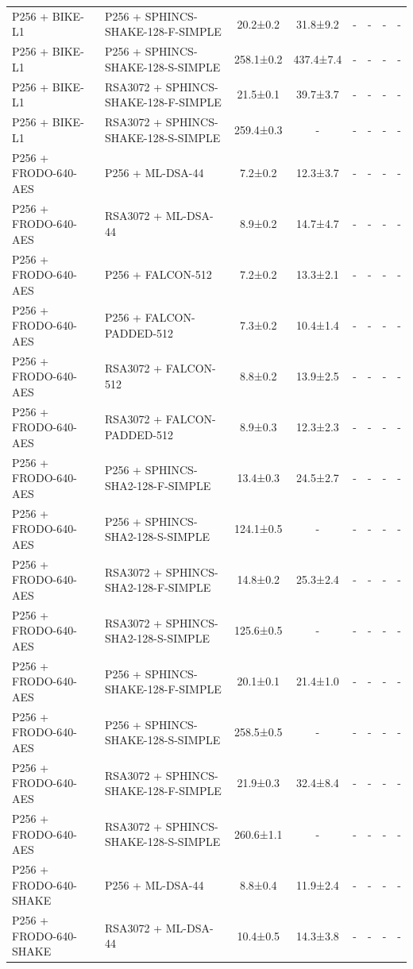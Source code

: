 \documentclass[10pt]{article}
\begin{document}
\begin{tabular}{@{}l l c c c c c c@{}}
P256 + BIKE-L1 & P256 + SPHINCS-SHAKE-128-F-SIMPLE & 20.2±0.2 & 31.8±9.2 & - & - & - & - \\
P256 + BIKE-L1 & P256 + SPHINCS-SHAKE-128-S-SIMPLE & 258.1±0.2 & 437.4±7.4 & - & - & - & - \\
P256 + BIKE-L1 & RSA3072 + SPHINCS-SHAKE-128-F-SIMPLE & 21.5±0.1 & 39.7±3.7 & - & - & - & - \\
P256 + BIKE-L1 & RSA3072 + SPHINCS-SHAKE-128-S-SIMPLE & 259.4±0.3 & - & - & - & - & - \\
P256 + FRODO-640-AES & P256 + ML-DSA-44 & 7.2±0.2 & 12.3±3.7 & - & - & - & - \\
P256 + FRODO-640-AES & RSA3072 + ML-DSA-44 & 8.9±0.2 & 14.7±4.7 & - & - & - & - \\
P256 + FRODO-640-AES & P256 + FALCON-512 & 7.2±0.2 & 13.3±2.1 & - & - & - & - \\
P256 + FRODO-640-AES & P256 + FALCON-PADDED-512 & 7.3±0.2 & 10.4±1.4 & - & - & - & - \\
P256 + FRODO-640-AES & RSA3072 + FALCON-512 & 8.8±0.2 & 13.9±2.5 & - & - & - & - \\
P256 + FRODO-640-AES & RSA3072 + FALCON-PADDED-512 & 8.9±0.3 & 12.3±2.3 & - & - & - & - \\
P256 + FRODO-640-AES & P256 + SPHINCS-SHA2-128-F-SIMPLE & 13.4±0.3 & 24.5±2.7 & - & - & - & - \\
P256 + FRODO-640-AES & P256 + SPHINCS-SHA2-128-S-SIMPLE & 124.1±0.5 & - & - & - & - & - \\
P256 + FRODO-640-AES & RSA3072 + SPHINCS-SHA2-128-F-SIMPLE & 14.8±0.2 & 25.3±2.4 & - & - & - & - \\
P256 + FRODO-640-AES & RSA3072 + SPHINCS-SHA2-128-S-SIMPLE & 125.6±0.5 & - & - & - & - & - \\
P256 + FRODO-640-AES & P256 + SPHINCS-SHAKE-128-F-SIMPLE & 20.1±0.1 & 21.4±1.0 & - & - & - & - \\
P256 + FRODO-640-AES & P256 + SPHINCS-SHAKE-128-S-SIMPLE & 258.5±0.5 & - & - & - & - & - \\
P256 + FRODO-640-AES & RSA3072 + SPHINCS-SHAKE-128-F-SIMPLE & 21.9±0.3 & 32.4±8.4 & - & - & - & - \\
P256 + FRODO-640-AES & RSA3072 + SPHINCS-SHAKE-128-S-SIMPLE & 260.6±1.1 & - & - & - & - & - \\
P256 + FRODO-640-SHAKE & P256 + ML-DSA-44 & 8.8±0.4 & 11.9±2.4 & - & - & - & - \\
P256 + FRODO-640-SHAKE & RSA3072 + ML-DSA-44 & 10.4±0.5 & 14.3±3.8 & - & - & - & - \\

\end{tabular}
\end{document}

